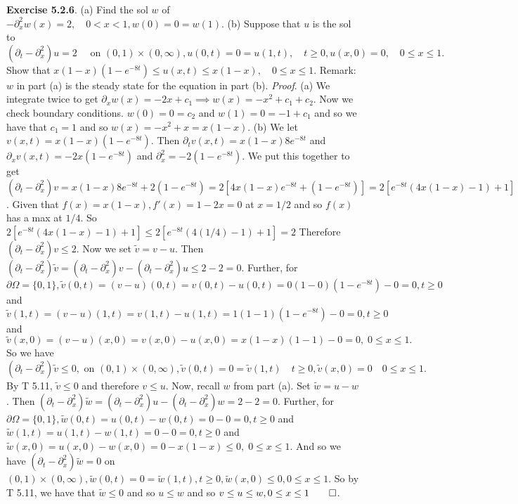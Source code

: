 {\bf Exercise 5.2.6}. (a) Find the sol $w$ of $-\partial_x^2 w(x)=2, \quad 0<x<1, w(0) = 0 = w(1).$ (b) Suppose that $u$ is the sol to $(\partial_t - \partial_x^2)u=2 \quad \text{ on } (0,1) \times (0, \infty), u(0,t)=0=u(1,t), \quad t \geq 0, u(x,0)=0, \quad 0 \leq x \leq 1.$ Show that 
$x(1-x)(1-e^{-8t})\leq u(x,t) \leq x(1-x), \quad 0 \leq x \leq 1.$ Remark:  $w$ in part (a) is the steady state for the equation in part (b). {\it Proof}. (a) We integrate twice to get
$\partial_x w(x)=-2x+c_1 \implies w(x)=-x^2+c_1+c_2$. Now we check boundary conditions. $w(0)=0=c_2$ and $w(1)=0=-1+c_1$ and so we have that $c_1 = 1$ and so $w(x)=-x^2+x=x(1-x)$. (b) We let $v(x,t)=x(1-x)(1-e^{-8t})$.  Then $\partial_t v(x,t)=x(1-x)8e^{-8t}$ and $\partial_x v(x,t)=-2x(1-e^{-8t})$ and $\partial_x^2=-2(1-e^{-8t})$.  We put this together to get $(\partial_t - \partial_x^2)v=x(1-x)8e^{-8t}+2(1-e^{-8t})=2[4x(1-x)e^{-8t}+(1-e^{-8t})]=2[e^{-8t}(4x(1-x)-1)+1]$.  Given that $f(x)=x(1-x), f'(x)=1-2x=0$ at $x=1/2$ and so $f(x)$ has a max at $1/4$.  So  $2[e^{-8t}(4x(1-x)-1)+1] \leq 2[e^{-8t}(4(1/4)-1)+1]=2$
Therefore $(\partial_t-\partial_x^2)v \leq 2$.  Now we set $\tilde{v}=v-u$. Then $(\partial_t - \partial_x^2) \tilde{v}=(\partial_t-\partial_x^2)v-(\partial_t-\partial_x^2)u \leq 2-2=0$.  Further, for $\partial \Omega = \{0,1\}, \tilde{v}(0,t)=(v-u)(0,t)=v(0,t)-u(0,t)=0(1-0)(1-e^{-8t})-0=0, t \geq 0$ and $\tilde{v}(1,t)=(v-u)(1,t)=v(1,t)-u(1,t)=1(1-1)(1-e^{-8t})-0=0, t \geq 0$ and $\tilde{v} (x,0) = (v-u)(x,0) = v(x,0)-u(x,0)=x(1-x)(1-1)-0=0, \; 0 \leq x \leq 1.$ So we have $(\partial_t -\partial_x^2)\tilde{v} \leq 0, \text{ on } (0,1)\times (0,\infty), \tilde{v}(0,t) = 0 = \tilde{v} (1,t) \quad t \geq 0, \tilde{v}(x,0)=0 \quad 0 \leq x \leq 1.$ By T 5.11, $\tilde{v} \leq 0$ and therefore $v \leq u$.  Now, recall $w$ from part (a).  Set $\tilde{w}=u-w$. Then 
$(\partial_t-\partial_x^2)\tilde{w}=(\partial_t-\partial_x^2)u-(\partial_t-\partial_x^2)w = 2-2=0$.  Further, for $\partial \Omega = \{0,1\}, \tilde{w}(0,t)=u(0,t)-w(0,t)=0-0=0, t \geq 0$ and $\tilde{w} (1,t) =u(1,t)-w(1,t)=0-0=0, t \geq 0$ and $\tilde{w}(x,0)=u(x,0)-w(x,0)=0-x(1-x) \leq 0, \; 0 \leq x \leq 1.$ And so we have $(\partial_t - \partial_x^2)\tilde{w}=0$ on $(0,1)\times (0,\infty), \tilde{w}(0,t)=0=\tilde{w}(1,t), t \geq 0, \tilde{w}(x,0) \leq 0, 0 \leq x \leq 1$. So by T 5.11, we have that $\tilde{w} \leq 0$ and so $u \leq w$ and so $v \leq u \leq w, 0 \leq x \leq 1\qed$.